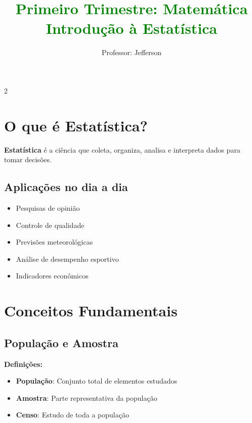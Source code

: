 \documentclass[11pt]{article}
\title{\textcolor{green}{Primeiro Trimestre: Matemática
    \\Introdução à Estatística}}
\author{Professor: Jefferson}
\date{}
\begin{document}
\maketitle
\vspace{-1cm}


\begin{multicols}{2}

\section*{O que é Estatística?}

\textbf{Estatística} é a ciência que coleta, organiza, analisa e interpreta dados para tomar decisões.

\subsection*{Aplicações no dia a dia}
\begin{itemize}
\item Pesquisas de opinião
\item Controle de qualidade
\item Previsões meteorológicas
\item Análise de desempenho esportivo
\item Indicadores econômicos
\end{itemize}

\section*{Conceitos Fundamentais}

\subsection*{População e Amostra}


\textbf{Definições:}
\begin{itemize}
\item \textbf{População}: Conjunto total de elementos estudados
\item \textbf{Amostra}: Parte representativa da população
\item \textbf{Censo}: Estudo de toda a população
\end{itemize}


\end{multicols}
\end{document}
